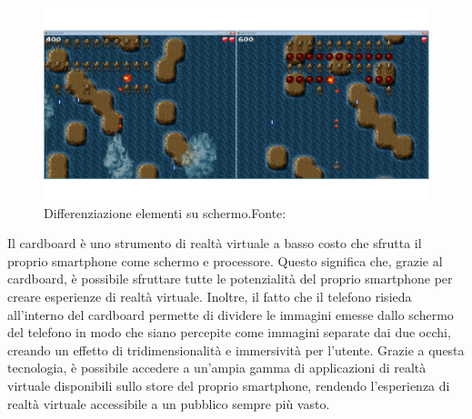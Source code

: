 \documentclass[
a4paper,
cleardoublepage=empty,
headings=twolinechapter,
numbers=autoenddot,
]{scrbook}
\begin{document}
    	\begin{figure}[H]
    	\centering
    	\includegraphics[width=0.8\linewidth]{image/3D4Amb_2}
    	\caption{Differenziazione elementi su schermo.Fonte:\cite{3d4amb}}
    	\label{fig:cardboard-3D4Amb_elementi}
    \end{figure}
    Il cardboard è uno strumento di realtà virtuale a basso costo che sfrutta il proprio smartphone come schermo e processore. Questo significa che, grazie al cardboard, è possibile sfruttare tutte le potenzialità del proprio smartphone per creare esperienze di realtà virtuale. Inoltre, il fatto che il telefono risieda all'interno del cardboard permette di dividere le immagini emesse dallo schermo del telefono in modo che siano percepite come immagini separate dai due occhi, creando un effetto di tridimensionalità e immersività per l'utente. Grazie a questa tecnologia, è possibile accedere a un'ampia gamma di applicazioni di realtà virtuale disponibili sullo store del proprio smartphone, rendendo l'esperienza di realtà virtuale accessibile a un pubblico sempre più vasto.
\end{document}

